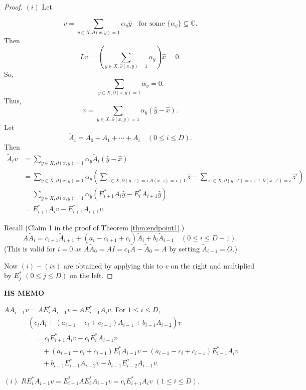 \documentclass[
]{book}
\theoremstyle{definition}
\theoremstyle{definition}
\theoremstyle{definition}
\theoremstyle{definition}
\theoremstyle{remark}
\begin{document}
\begin{proof}
\leavevmode

\((i)\) Let

\[v = \sum_{y\in X, \partial(x,y)=1}\alpha_y \hat{y} \quad \text{for some }\{\alpha_g\}\subseteq \mathbb{C}.\]
Then
\[Lv = \left(\sum_{y\in X, \partial(x,y)=1}\alpha_y\right)\hat{x} = 0.\]
So,
\[\sum_{y\in X, \partial(x,y)=1}\alpha_y = 0.\]
Thus,
\[v = \sum_{y\in X, \partial(x,y)=1}\alpha_y(\hat{y}-\hat{x}).\]
Let
\[\tilde{A}_i = A_0 + A_1 + \cdots + A_i \quad (0\leq i\leq D).\]
Then
\begin{align}
\tilde{A}_iv & = \sum_{y\in X, \partial(x,y)=1}\alpha_y \tilde{A}_i(\hat{y}-\hat{x})\\
& = \sum_{y\in X, \partial(x,y)=1}\alpha_y\left(\sum_{z\in X, \partial(y,z)=i, \partial(x,z)=i+1}\hat{z}-\sum_{z'\in X, \partial(y,z')=i+1, \partial(x,z')=i}\hat{z}'\right)\\
& = \sum_{y\in X, \partial(x,y)=1}\alpha_y(E^*_{i+1}A_i\hat{y}- E^*_iA_{i+1}\hat{y})\\
& = E^*_{i+1}A_iv - E^*_{i+1}A_{i+1}v.
\end{align}

Recall (Claim 1 in the proof of Theorem \ref{thm:endpoint1}.)
\[A\tilde{A}_i = c_{i+1}\tilde{A}_{i+1}+ (a_i-c_{i+1}+c_i)\tilde{A}_i + b_i\tilde{A}_{i-1}\quad (0\leq i\leq D-1).\]
(This is valid for \(i=0\) as \(A\tilde{A}_0 = AI = c_1\tilde{A}- \tilde{A}_0 = A\) by setting \(\tilde{A}_{i-1} = O\).)

Now \((i)-(iv)\) are obtained by applying this to \(v\) on the right and multiplied by \(E^*_j\) \((0\leq j\leq D)\) on the left.

\end{proof}

\textbf{HS MEMO}

\(A\tilde{A}_{i-1}v = AE^*_iA_{i-1}v - AE^*_{i-1}A_iv\). For \(1\leq i\leq D\),
\begin{align}
& (c_i\tilde{A}_i + (a_{i-1}-c_i+c_{i-1})\tilde{A}_{i-1}+b_{i-1}\tilde{A}_{i-2})v\\
& \quad = c_i E^*_{i+1}A_iv - c_iE^*_iA_{i+1}v\\
& \qquad + (a_{i-1}-c_i+c_{i-1})E^*_iA_{i-1}v - (a_{i-1}-c_i+c_{i-1})E^*_{i-1}A_iv\\
& \qquad + b_{i-1}E^*_{i-1}A_{i-2}v - b_{i-1}E^*_{i-2}A_{i-1}v.
\end{align}

\((i)\) \(RE^*_iA_{i-1}v = E^*_{i+1}AE^*_iA_{i-1}v = c_iE^*_{i+1}A_iv\) \((1\leq i\leq D)\).
\end{document}
